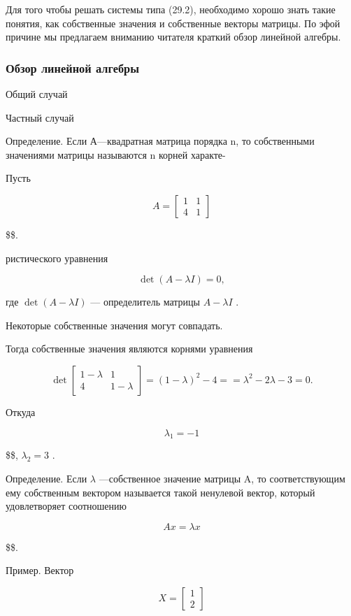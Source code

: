 \documentclass[
  ukrainian,
]{article}
\begin{document}
Для того чтобы решать системы типа (29.2), необходимо хорошо знать такие
понятия, как собственные значения и собственные векторы матрицы. По эфой
причине мы предлагаем вниманию читателя краткий обзор линейной алгебры.

\subsubsection{Обзор линейной
алгебры}\label{ux43eux431ux437ux43eux440-ux43bux438ux43dux435ux439ux43dux43eux439-ux430ux43bux433ux435ux431ux440ux44b}

Общий случай

Частный случай

Определение. Если А---квадратная матрица порядка n, то собственными
значениями матрицы называются n корней характе-

Пусть

\[
A = \begin{bmatrix} 1 & 1 \\ 4 & 1 \end{bmatrix}
\]

\$\$.

ристического уравнения

\[
\det\left(A-\lambda I\right)=0,
\]

где \(\det(A-\lambda I)\) --- определитель матрицы \(A-\lambda I\) .

Некоторые собственные значения могут совпадать.

Тогда собственные значения являются корнями уравнения

\[
\det \begin{bmatrix} 1-\lambda & 1\\ 4 & 1-\lambda \end{bmatrix} = (1-\lambda)^2 - 4 =
= \lambda^2 - 2\lambda - 3 = 0.
\]

Откуда

\[
\lambda_1 = -1
\]

\$\$, \(\lambda_2 = 3\) .

Определение. Если \(\lambda\) ---собственное значение матрицы A, то
соответствующим ему собственным вектором называется такой ненулевой
вектор, который удовлетворяет соотношению

\[
Ax = \lambda x
\]

\$\$.

Пример. Вектор

\[
X = \begin{bmatrix} 1 \\ 2 \end{bmatrix}
\]
\end{document}
